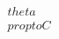 \documentclass[preview]{standalone}
\begin{document}
\begin{align*}
\quad\\theta \quad\\propto C
\end{align*}
\end{document}
